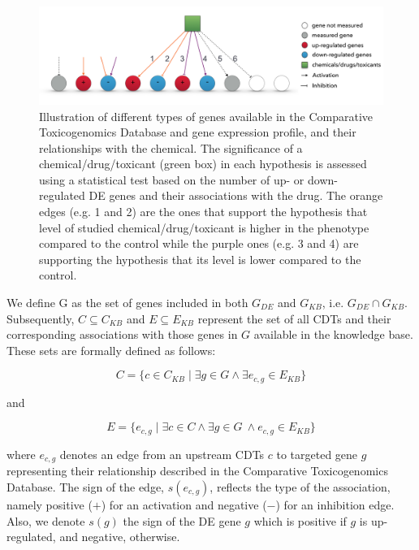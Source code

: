 \begin{figure}
\centering
  \includegraphics[width=0.9\linewidth]{Figures/SecondEvidence.pdf}
  \caption{Illustration of different types of genes available in the Comparative Toxicogenomics Database and gene expression profile, and their relationships with the chemical. The significance of a chemical/drug/toxicant (green box) in each hypothesis is assessed using a statistical test based on the number of up- or down-regulated DE genes and their associations with the drug. The orange edges (e.g. 1 and 2) are the ones that support the hypothesis that level of studied chemical/drug/toxicant is higher in the phenotype compared to the control while the purple ones (e.g. 3 and 4) are supporting the hypothesis that its level is lower compared to the control.}
  \label{fig:SignificantDrug}
\end{figure}

We define G as  the set of genes included in both $G_{DE}$ and $G_{KB}$, i.e.  $G_{DE} \cap G_{KB}$. Subsequently, $C \subseteq C_{KB}$  and $E \subseteq E_{KB}$ represent the set of all CDTs and their corresponding associations with those genes in $G$ available in the knowledge base. These sets are formally defined as follows:

\begin{equation}C = \{c \in C_{KB} \mid \exists g \in G \land \exists e_{c,g} \in E_{KB} \}\end{equation}

and 

\begin{equation} E = \{ e_{c,g} \mid \exists c \in C \land  \exists g \in G \ \land  e_{c,g} \in E_{KB} \} \end{equation}


where $e_{c,g}$ denotes an edge from an upstream CDTs $c$ to targeted gene $g$ representing their relationship described in the Comparative Toxicogenomics Database. The sign of the edge, $s(e_{c,g})$, reflects the type of the association, namely positive ($+$) for an activation and negative ($-$) for an inhibition edge. Also, we denote $s(g)$ the sign of the DE gene $g$ which is positive if $g$ is up-regulated, and negative, otherwise. 

